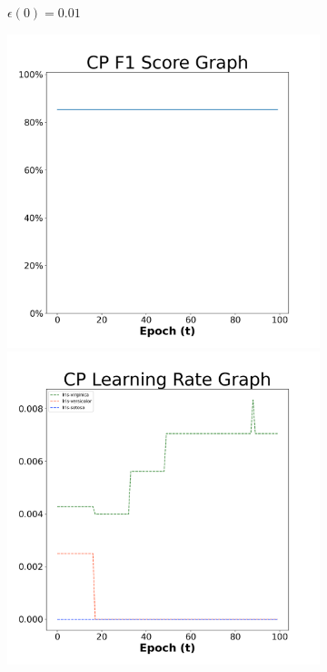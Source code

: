 \begin{figure}[H]
\begin{subfigure}{0.3\textwidth}
  \caption{$\epsilon(0)=0.01$}
\end{subfigure}\hfil %
\begin{subfigure}{0.3\textwidth}
  \includegraphics[width=\linewidth]{images/exper2/iris/CP_0.03_f1.png}
  \includegraphics[width=\linewidth]{images/exper2/iris/CP_0.03_lr.png}

\end{subfigure}
\end{figure}
